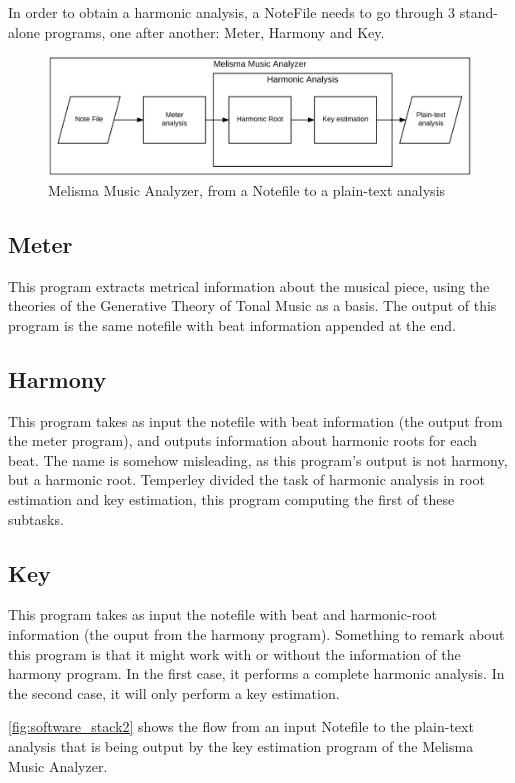   In order to obtain a harmonic analysis, a NoteFile needs to go through 3 stand-alone programs, one after another: Meter, Harmony and Key.

  \begin{figure}[ht]
    \centering
      \includegraphics[width=1.0\textwidth]{04-methodology/figures/2}
    \caption{Melisma Music Analyzer, from a Notefile to a plain-text analysis}
    \label{fig:software_stack2}
  \end{figure}

  \subsection{Meter}
    This program extracts metrical information about the musical piece, using the theories of the Generative Theory of Tonal Music as a basis.
    The output of this program is the same notefile with beat information appended at the end.
  \subsection{Harmony}
    This program takes as input the notefile with beat information (the output from the meter program), and outputs information about harmonic roots for each beat. The name is somehow misleading, as this program's output is not harmony, but a harmonic root. Temperley divided the task of harmonic analysis in root estimation and key estimation, this program computing the first of these subtasks.
  \subsection{Key}
    This program takes as input the notefile with beat and harmonic-root information (the ouput from the harmony program). Something to remark about this program is that it might work with or without the information of the harmony program. In the first case, it performs a complete harmonic analysis. In the second case, it will only perform a key estimation.

    \autoref{fig:software_stack2} shows the flow from an input Notefile to the plain-text analysis that is being output by the key estimation program of the Melisma Music Analyzer.

